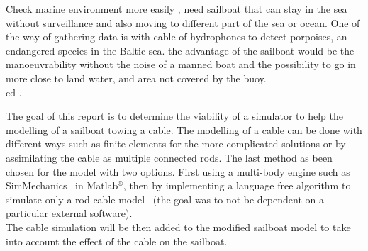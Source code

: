 Check marine environment more easily , need sailboat that can stay in the sea without surveillance 
and also moving to different part of the sea or ocean. One of the way of gathering data is with cable of 
hydrophones to detect porpoises, an endangered species in the Baltic sea. the advantage of the sailboat would be the manoeuvrability without the noise of a manned boat and the possibility to go in more close to land water, and area not covered by the buoy.\\
cd .


The goal of this report is to determine the viability of a simulator to help
the modelling of a sailboat towing a cable. The modelling of a cable can be done
with different ways such as finite elements for the more complicated solutions or by assimilating the cable
as multiple connected rods. The last method as been chosen for the model with two options. First using 
a multi-body engine such as SimMechanics\texttrademark~ in Matlab$^{\circledR}$, then by implementing a language free algorithm to simulate
only a rod cable model~\cite{johansen2007modelling} (the goal was to not be dependent on a particular external software).\\
The cable simulation will be then added to the modified sailboat model to take into account the effect of
the cable on the sailboat.